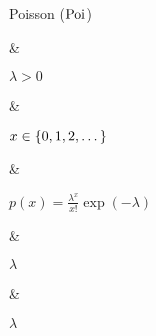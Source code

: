 Poisson ($\operatorname{Poi}$)

&

$\lambda > 0$

& 

$x \in \mathbb \{0, 1, 2, \dotsc\}$

&

\(\displaystyle
	p(x) = \frac{\lambda^x}{x!} \exp(-\lambda)
\)

& 

$\lambda$

&

$\lambda$